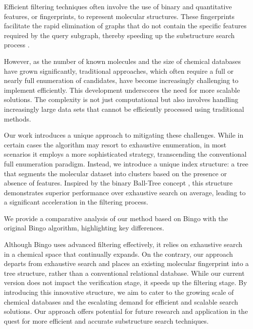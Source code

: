 Efficient filtering techniques often involve the use of binary and quantitative features, or fingerprints, to represent molecular 
structures. These fingerprints facilitate the rapid elimination of graphs that do not contain the specific features required by the 
query subgraph, thereby speeding up the substructure search process \cite{bonchi2011, klein2014}.

However, as the number of known molecules and the size of chemical databases have grown significantly, traditional approaches, 
which often require a full or nearly full enumeration of candidates, have become increasingly challenging to implement efficiently. 
This development underscores the need for more scalable solutions. The complexity is not just computational but also involves 
handling increasingly large data sets that cannot be efficiently processed using traditional methods.

Our work introduces a unique approach to mitigating these challenges. While in certain cases the algorithm may resort to exhaustive 
enumeration, in most scenarios it employs a more sophisticated strategy, transcending the conventional full enumeration paradigm. 
Instead, we introduce a unique index structure: a tree that segments the molecular dataset into clusters based on the presence or 
absence of features. Inspired by the binary Ball-Tree concept \cite{omohundro1989, clarkson1994}, this structure demonstrates 
superior performance over exhaustive search on average, leading to a significant acceleration in the filtering process.

We provide a comparative analysis of our method based on Bingo \cite{Pavlov2010} with the original Bingo algorithm, highlighting key differences. 

Although Bingo uses advanced filtering effectively, it relies on exhaustive search in a chemical space that continually expands. On the contrary, 
our approach departs from exhaustive search and places an existing molecular fingerprint into a tree structure, rather than a 
conventional relational database. While our current version does not impact the verification stage, it speeds up the filtering stage.
By introducing this innovative structure, we aim to cater to the growing scale of chemical databases and the escalating demand 
for efficient and scalable search solutions. Our approach offers potential for future research and application in the quest 
for more efficient and accurate substructure search techniques.
